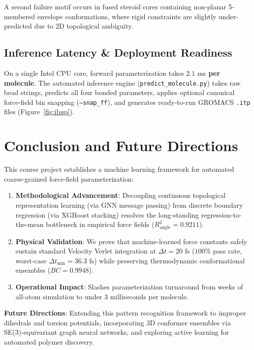 \documentclass[10pt,journal,compsoc]{IEEEtran}
\begin{document}
A second failure motif occurs in fused steroid cores containing non-planar 5-membered envelope conformations, where rigid constraints are slightly under-predicted due to 2D topological ambiguity.

\subsection{Inference Latency \& Deployment Readiness}
On a single Intel CPU core, forward parameterization takes \textbf{$2.1\text{ ms}$ per molecule}. The automated inference engine (\texttt{predict\_molecule.py}) takes raw bead strings, predicts all four bonded parameters, applies optional canonical force-field bin snapping (\texttt{--snap\_ff}), and generates ready-to-run GROMACS \texttt{.itp} files (Figure~\ref{fig:ibup}).

\section{Conclusion and Future Directions}
\label{sec:conclusion}

This course project establishes a machine learning framework for automated coarse-grained force-field parameterization:
\begin{enumerate}
    \item \textbf{Methodological Advancement}: Decoupling continuous topological representation learning (via GNN message passing) from discrete boundary regression (via XGBoost stacking) resolves the long-standing regression-to-the-mean bottleneck in empirical force fields ($R^2_{\text{angle}} = \mathbf{0.9211}$).
    \item \textbf{Physical Validation}: We prove that machine-learned force constants safely sustain standard Velocity Verlet integration at $\Delta t = 20\text{ fs}$ ($100\%$ pass rate, worst-case $\Delta t_{\min} = 36.3\text{ fs}$) while preserving thermodynamic conformational ensembles ($BC = 0.9948$).
    \item \textbf{Operational Impact}: Slashes parameterization turnaround from weeks of all-atom simulation to under 3 milliseconds per molecule.
\end{enumerate}

\textbf{Future Directions}: Extending this pattern recognition framework to improper dihedrals and torsion potentials, incorporating 3D conformer ensembles via SE(3)-equivariant graph neural networks, and exploring active learning for automated polymer discovery.



\end{document}
